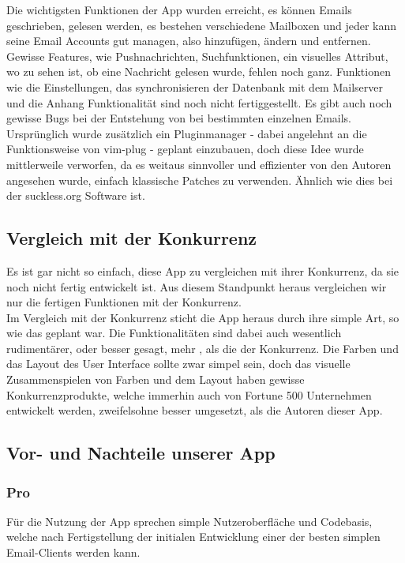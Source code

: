 \documentclass[a4paper,11pt]{article}
\begin{document}
Die wichtigsten Funktionen der App wurden erreicht, es können Emails geschrieben, gelesen werden, es bestehen verschiedene Mailboxen und jeder kann seine Email Accounts gut managen, also hinzufügen, ändern und entfernen. Gewisse Features, wie Pushnachrichten, Suchfunktionen, ein visuelles Attribut, wo zu sehen ist, ob eine Nachricht gelesen wurde, fehlen noch ganz. Funktionen wie die Einstellungen, das synchronisieren der Datenbank mit dem Mailserver und die Anhang Funktionalität sind noch nicht fertiggestellt. Es gibt auch noch gewisse Bugs bei der Entstehung von  \cite{edgecase} bei bestimmten einzelnen Emails.\\

Ursprünglich wurde zusätzlich ein Pluginmanager - dabei angelehnt an die Funktionsweise von vim-plug \cite{plug} - geplant einzubauen, doch diese Idee wurde mittlerweile verworfen, da es weitaus sinnvoller und effizienter von den Autoren angesehen wurde, einfach klassische Patches zu verwenden. Ähnlich wie dies bei der suckless.org Software ist. \cite{dwm}

\subsection{Vergleich mit der Konkurrenz}
Es ist gar nicht so einfach, diese App zu vergleichen mit ihrer Konkurrenz, da sie noch nicht fertig entwickelt ist. Aus diesem Standpunkt heraus vergleichen wir nur die fertigen Funktionen mit der Konkurrenz.\\

Im Vergleich mit der Konkurrenz sticht die App heraus durch ihre simple Art, so wie das geplant war. Die Funktionalitäten sind dabei auch wesentlich rudimentärer, oder besser gesagt, mehr , als die der Konkurrenz. Die Farben und das Layout des User Interface sollte zwar simpel sein, doch das visuelle Zusammenspielen von Farben und dem Layout haben gewisse Konkurrenzprodukte, welche immerhin auch von Fortune 500 Unternehmen entwickelt werden, zweifelsohne besser umgesetzt, als die Autoren dieser App.
\subsection{Vor- und Nachteile unserer App}
\subsubsection{Pro}
Für die Nutzung der App sprechen simple Nutzeroberfläche und Codebasis, welche nach Fertigstellung der initialen Entwicklung einer der besten simplen Email-Clients werden kann.
\end{document}
